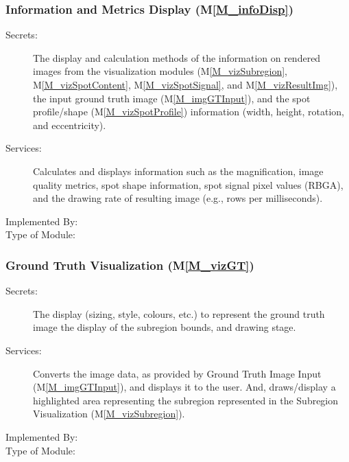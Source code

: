 \documentclass[12pt, titlepage]{article}
\newcommand{\mref}[1]{M\ref{#1}}
\begin{document}
\subsubsection{Information and Metrics Display (\mref{M_infoDisp})}
\begin{description}
\item[Secrets:]The display and calculation methods of the information on rendered
  images from the visualization modules (\mref{M_vizSubregion},
  \mref{M_vizSpotContent}, \mref{M_vizSpotSignal}, and \mref{M_vizResultImg}),
  the input ground truth image (\mref{M_imgGTInput}), and the spot profile/shape 
  (\mref{M_vizSpotProfile}) information (width, height, rotation, and eccentricity).
\item[Services:]Calculates and displays information such as the magnification,
  image quality metrics, spot shape information, spot signal pixel values (RBGA),
  and the drawing rate of resulting image (e.g., rows per milliseconds).
\item[Implemented By:] \progname{}
\item[Type of Module:] 
\end{description}


\subsubsection{Ground Truth Visualization (\mref{M_vizGT})}
\begin{description}
\item[Secrets:]The display (sizing, style, colours, etc.) to represent the ground truth image
  the display of the subregion bounds, and drawing stage.
\item[Services:]Converts the image data, as provided by Ground Truth Image Input (\mref{M_imgGTInput}),
  and displays it to the user. And, draws/display a highlighted area representing the subregion
  represented in the Subregion Visualization (\mref{M_vizSubregion}).
\item[Implemented By:] \progname{}
\item[Type of Module:] 
\end{description}
\end{document}

